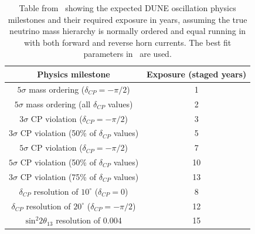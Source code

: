 \begin{table}
  \caption[DUNE oscillation physics milestones.]{Table from~\cite{tdrVol2} showing the expected DUNE oscillation physics milestones and their required exposure in years, assuming the true neutrino mass hierarchy is normally ordered and equal running in with both forward and reverse horn currents. The best fit parameters in~\cite{nufit4} are used.}
  \label{tab:physicsMilestones}
  \centering
  \begin{tabular}{c c}
    \hline
    Physics milestone & Exposure (staged years) \\
    \hline
    $5\sigma$ mass ordering ($\delta_{CP} = -\pi/2$) & 1 \\
    $5\sigma$ mass ordering (all $\delta_{CP}$ values) & 2 \\
    $3\sigma$ CP violation ($\delta_{CP}=-\pi/2$) & 3 \\
    $3\sigma$ CP violation (50\% of $\delta_{CP}$ values) & 5 \\
    $5\sigma$ CP violation ($\delta_{CP}=-\pi/2$) & 7 \\
    $5\sigma$ CP violation (50\% of $\delta_{CP}$ values) & 10 \\
    $3\sigma$ CP violation (75\% of $\delta_{CP}$ values) & 13 \\
    $\delta_{CP}$ resolution of $10^{\circ}$ ($\delta_{CP}=0$) & 8 \\
    $\delta_{CP}$ resolution of $20^{\circ}$ ($\delta_{CP}=-\pi/2$) & 12 \\
    $\text{sin}^{2}2\theta_{13}$ resolution of 0.004 & 15 \\
    \hline
  \end{tabular}
\end{table}

